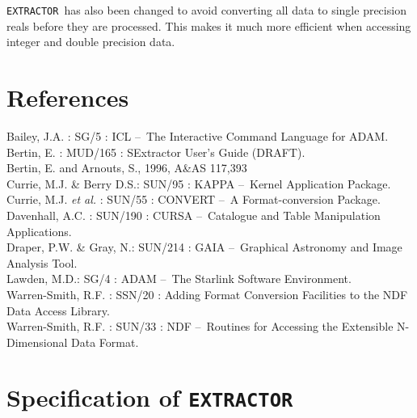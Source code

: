 \documentclass[twoside,11pt]{article}
\newcommand{\xref}[3]{#1}
\newcommand{\xlabel}[1]{}
\renewcommand{\_}{\texttt{\symbol{95}}}
\newcommand{\EXTRACTOR}{\texttt{EXTRACTOR}}
\newcommand{\dash}{--}
\newcommand{\dash}{-}
\begin{document}
 \EXTRACTOR\ has also been changed to avoid converting all data to single
 precision reals before they are processed. This makes it much more efficient
 when accessing integer and double precision data.


\section{\xlabel{references}References}
Bailey, J.A. : \xref{SG/5}{sg5}{} : ICL \dash\ The Interactive Command Language for ADAM.\\
Bertin, E. : MUD/165 : SExtractor User's Guide (DRAFT).\\
Bertin, E. and Arnouts, S., 1996, A\&AS 117,393\\
Currie, M.J. \& Berry D.S.: \xref{SUN/95}{sun95}{} : KAPPA \dash\ Kernel Application Package.\\
Currie, M.J. \textit{et al.} : \xref{SUN/55}{sun55}{} : CONVERT \dash\ A Format-conversion Package.\\
Davenhall, A.C. : \xref{SUN/190}{sun190}{} : CURSA \dash\ Catalogue and Table Manipulation Applications.\\
Draper, P.W. \& Gray, N.: \xref{SUN/214}{sun214}{} : GAIA \dash\ Graphical Astronomy and Image Analysis Tool.\\
Lawden, M.D.: \xref{SG/4}{sg4}{} : ADAM \dash\ The Starlink Software Environment.\\
Warren-Smith, R.F. : \xref{SSN/20}{ssn20}{} : Adding Format Conversion Facilities to the NDF Data Access Library.\\
Warren-Smith, R.F. : \xref{SUN/33}{sun33}{} : NDF \dash\ Routines for Accessing the Extensible N-Dimensional Data Format.\\

\newpage
\appendix
\section{\xlabel{specification_of_extractor}Specification of \EXTRACTOR}
\end{document}
